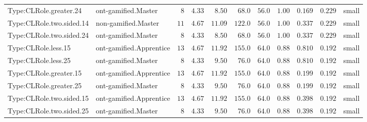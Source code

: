 \documentclass[6pt,a4paper]{article}
\begin{document}
{\begin{longtable}{llrrrrrrrrl}
Type:CLRole.greater.24&ont-gamified.Master&$ 8$&$4.33$&$ 8.50$&$ 68.0$&$ 56.0$&$ 1.00$&$0.169$&$0.229$&small\tabularnewline
Type:CLRole.two.sided.14&non-gamified.Master&$11$&$4.67$&$11.09$&$122.0$&$ 56.0$&$ 1.00$&$0.337$&$0.229$&small\tabularnewline
Type:CLRole.two.sided.24&ont-gamified.Master&$ 8$&$4.33$&$ 8.50$&$ 68.0$&$ 56.0$&$ 1.00$&$0.337$&$0.229$&small\tabularnewline
Type:CLRole.less.15&ont-gamified.Apprentice&$13$&$4.67$&$11.92$&$155.0$&$ 64.0$&$ 0.88$&$0.810$&$0.192$&small\tabularnewline
Type:CLRole.less.25&ont-gamified.Master&$ 8$&$4.33$&$ 9.50$&$ 76.0$&$ 64.0$&$ 0.88$&$0.810$&$0.192$&small\tabularnewline
Type:CLRole.greater.15&ont-gamified.Apprentice&$13$&$4.67$&$11.92$&$155.0$&$ 64.0$&$ 0.88$&$0.199$&$0.192$&small\tabularnewline
Type:CLRole.greater.25&ont-gamified.Master&$ 8$&$4.33$&$ 9.50$&$ 76.0$&$ 64.0$&$ 0.88$&$0.199$&$0.192$&small\tabularnewline
\newpage
Type:CLRole.two.sided.15&ont-gamified.Apprentice&$13$&$4.67$&$11.92$&$155.0$&$ 64.0$&$ 0.88$&$0.398$&$0.192$&small\tabularnewline
Type:CLRole.two.sided.25&ont-gamified.Master&$ 8$&$4.33$&$ 9.50$&$ 76.0$&$ 64.0$&$ 0.88$&$0.398$&$0.192$&small\tabularnewline
\hline
\end{longtable}}
\end{document}
